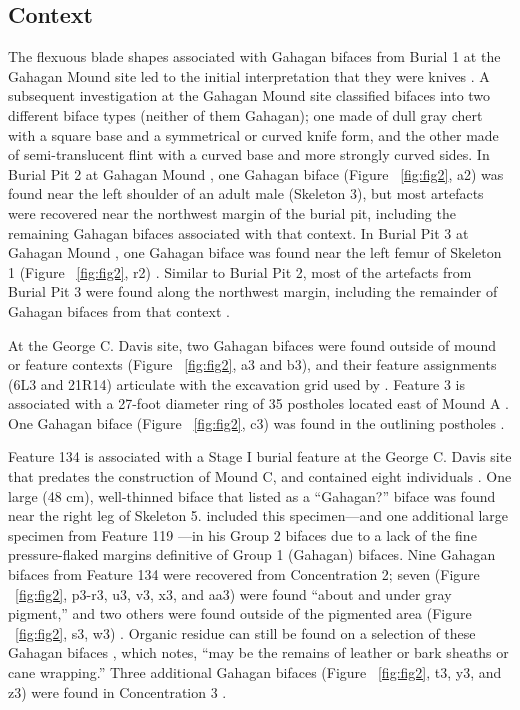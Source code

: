 \documentclass[review]{elsarticle}
\begin{document}
\subsection*{Context}

The flexuous blade shapes associated with Gahagan bifaces from Burial 1 at the Gahagan Mound site led to the initial interpretation that they were knives \citep[Figures 18-21]{RN2740}. A subsequent investigation at the Gahagan Mound site \citep{RN5274} classified bifaces into two different biface types (neither of them Gahagan); one made of dull gray chert with a square base and a symmetrical or curved knife form, and the other made of semi-translucent flint with a curved base and more strongly curved sides. In Burial Pit 2 at Gahagan Mound \citep[Plate 21]{RN5274}, one Gahagan biface (Figure ~\ref{fig:fig2}, a2) \citep[Plate 27, No. 1, 3]{RN5274} was found near the left shoulder of an adult male (Skeleton 3), but most artefacts were recovered near the northwest margin of the burial pit, including the remaining Gahagan bifaces associated with that context. In Burial Pit 3 at Gahagan Mound \citep[Plate 23, 1]{RN5274}, one Gahagan biface was found near the left femur of Skeleton 1 (Figure ~\ref{fig:fig2}, r2) \citep[Plate 27, No. 1, 2]{RN5274}. Similar to Burial Pit 2, most of the artefacts from Burial Pit 3 were found along the northwest margin, including the remainder of Gahagan bifaces from that context \citep{RN5274}.

At the George C. Davis site, two Gahagan bifaces were found outside of mound or feature contexts (Figure ~\ref{fig:fig2}, a3 and b3), and their feature assignments (6L3 and 21R14) articulate with the excavation grid used by \cite{RN800}. Feature 3 is associated with a 27-foot diameter ring of 35 postholes located east of Mound A \citep[Figure 4]{RN800}. One Gahagan biface (Figure ~\ref{fig:fig2}, c3) was found in the outlining postholes \cite{RN800}.

Feature 134 is associated with a Stage I burial feature at the George C. Davis site that predates the construction of Mound C, and contained eight individuals \citep{RN808,RN5050}. One large (48 cm), well-thinned biface that \citet[22]{RN808} listed as a “Gahagan?” biface was found near the right leg of Skeleton 5.  \citet[Figure 19x]{RN3684} included this specimen---and one additional large specimen from Feature 119 \citep[Figure 19w]{RN3684}---in his Group 2 bifaces due to a lack of the fine pressure-flaked margins definitive of Group 1 (Gahagan) bifaces. Nine Gahagan bifaces from Feature 134 were recovered from Concentration 2; seven (Figure ~\ref{fig:fig2}, p3-r3, u3, v3, x3, and aa3) were found “about and under gray pigment,” and two others were found outside of the pigmented area (Figure ~\ref{fig:fig2}, s3, w3) \citep[21-23 and Figure 12]{RN808}. Organic residue can still be found on a selection of these Gahagan bifaces \citep[Figure 2]{RN11783}, which \citet[228]{RN3684} notes, “may be the remains of leather or bark sheaths or cane wrapping.” Three additional Gahagan bifaces (Figure ~\ref{fig:fig2}, t3, y3, and z3) were found in Concentration 3 \citep[21-22 and Figure 12]{RN808}.
\end{document}

